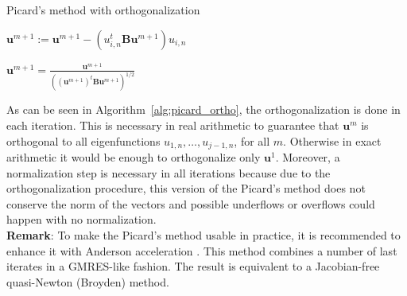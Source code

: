 \documentclass[preprint,12pt]{elsarticle}
\begin{document}
\begin{algorithm}[H] \caption{Picard's method with orthogonalization} \label{alg:picard_ortho} 
\begin{algorithmic}

    

\REPEAT



\STATE $\mathbf{u}^{m+1}:=\mathbf{u}^{m+1}-(u_{i,n}^t\mathbf{B}\mathbf{u}^{m+1})u_{i,n}$
\ENDFOR


\STATE $\displaystyle \mathbf{u}^{m+1}=\frac{\mathbf{u}^{m+1}}{((\mathbf{u}^{m+1})^t\mathbf{B}\mathbf{u}^{m+1})^{1/2}}$
\end{algorithmic}
\end{algorithm}

As can be seen in Algorithm~\ref{alg:picard_ortho}, the orthogonalization is done in each iteration. 
This is necessary in real arithmetic to guarantee that $\mathbf{u}^m$ is orthogonal to all 
eigenfunctions $u_{1,n},\dots,u_{j-1,n}$, for all $m$. Otherwise in exact arithmetic it would 
be enough to orthogonalize only $\mathbf{u}^1$. Moreover, a normalization step is necessary 
in all iterations because due to the orthogonalization procedure, this version of the Picard's 
method does not conserve the norm of the vectors and possible underflows or overflows could 
happen with no normalization.\\

\noindent
{\bf Remark}: To make the Picard's method usable in practice, it is 
recommended to enhance it with Anderson acceleration \cite{anderson}.
This method combines a number of last iterates in a GMRES-like fashion. 
The result is equivalent to a Jacobian-free quasi-Newton (Broyden) method.

\end{document}
